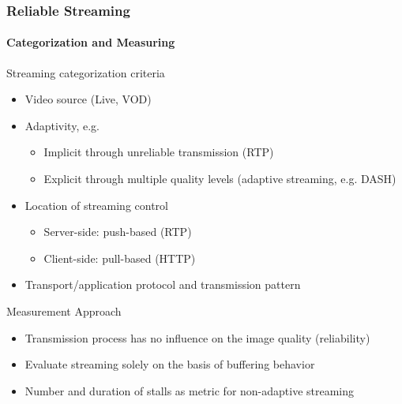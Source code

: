 \documentclass{beamer}
\begin{document}
\begin{frame}
	\frametitle{Reliable Streaming}
	\framesubtitle{Categorization and Measuring}

	\begin{overlayarea}{\textwidth}{\textheight}
		Streaming categorization criteria
		\begin{itemize}
			\item Video source (Live, VOD)
			\item Adaptivity, e.g.
				\begin{itemize}
					\item Implicit through unreliable transmission (RTP)
					\item Explicit through multiple quality levels (adaptive streaming, e.g. DASH)
				\end{itemize}
			\item Location of streaming control
				\begin{itemize}
					\item Server-side: push-based (RTP)
					\item Client-side: pull-based (HTTP)
				\end{itemize}
			\item Transport/application protocol and transmission pattern
		\end{itemize}

		\pause
		\begin{block}{Measurement Approach}
		\begin{itemize}
			\item Transmission process has no influence on the image quality (reliability)
			\item Evaluate streaming solely on the basis of buffering behavior
			\item Number and duration of stalls as metric for non-adaptive streaming
		\end{itemize}
		\end{block}
	\end{overlayarea}
\end{frame}
\end{document}

